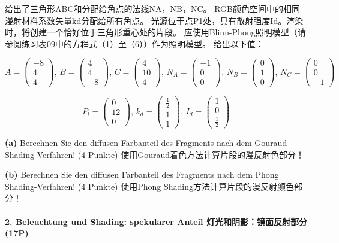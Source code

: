 \documentclass[fleqn]{article}
\begin{document}
 给出了三角形ABC和分配给角点的法线NA，NB，NC。 RGB颜色空间中的相同漫射材料系数矢量kd分配给所有角点。 光源位于点P1处，具有散射强度Id。渲染时，将创建一个恰好位于三角形重心处的片段。 应使用Blinn-Phong照明模型（请参阅练习表09中的方程式（1）至（6））作为照明模型。 给出以下值：

$$A=\begin{pmatrix}
    -8\\4\\4
\end{pmatrix},\,B=\begin{pmatrix}
    4\\4\\-8
\end{pmatrix},\,C=\begin{pmatrix}
    4\\10\\4
\end{pmatrix},\,N_A=\begin{pmatrix}
    -1\\0\\0
\end{pmatrix},\,N_B=\begin{pmatrix}
    0\\1\\0
\end{pmatrix},\,N_C=\begin{pmatrix}
    0\\0\\-1
\end{pmatrix}$$

$$P_l=\begin{pmatrix}
    0\\12\\0
\end{pmatrix},\,k_d=\begin{pmatrix}
    \frac{1}{2}\\1\\1
\end{pmatrix},\,I_d=\begin{pmatrix}
    1\\0\\\frac{1}{2}
\end{pmatrix}$$

\indent\textbf{(a)} Berechnen Sie den diffusen Farbanteil des Fragments nach dem Gouraud Shading-Verfahren! (4 Punkte)
使用Gouraud着色方法计算片段的漫反射色部分！

\indent\textbf{(b)} Berechnen Sie den diffusen Farbanteil des Fragments nach dem Phong Shading-Verfahren! (4 Punkte)
使用Phong Shading方法计算片段的漫反射颜色部分！
\\
\\
\noindent\textbf{2. Beleuchtung und Shading: spekularer Anteil 灯光和阴影：镜面反射部分(17P)}
\end{document}
